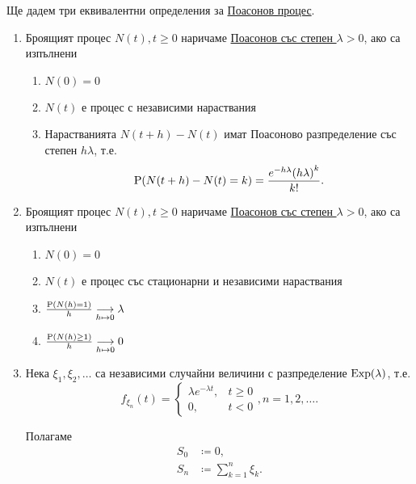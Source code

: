 \documentclass[numbers=endperiod, DIV=15, bibliography=totocnumbered]{scrartcl}
\begin{document}
\begin{definition}
  Ще дадем три еквивалентни определения за \uline{Поасонов процес}.

  \begin{enumerate}
    \item\label{def:pp-1} Броящият процес $N(t), t \geq 0$ наричаме \uline{Поасонов със степен $\lambda > 0$}, ако са изпълнени
    \begin{enumerate}
      \item $N(0) = 0$
      \item $N(t)$ е процес с независими нараствания
      \item Нарастванията $N(t+h)-N(t)$ имат Поасоново разпределение със степен $h\lambda$, т.е.
      \begin{displaymath}
        \operatorname{P}(N(t+h)-N(t) = k)
        =
        \frac{e^{-h\lambda} {(h\lambda)}^k} {k!}.
      \end{displaymath}
    \end{enumerate}

    \item\label{def:pp-2} Броящият процес $N(t), t \geq 0$ наричаме \uline{Поасонов със степен $\lambda > 0$}, ако са изпълнени
    \begin{enumerate}
      \item $N(0) = 0$
      \item $N(t)$ е процес със стационарни и независими нараствания
      \item $\frac {\operatorname{P}(N(h) = 1)} h \underset {h \mapsto 0} \longrightarrow \lambda$
      \item $\frac {\operatorname{P}(N(h) \geq 1)} h \underset {h \mapsto 0} \longrightarrow 0$
    \end{enumerate}

    \item\label{def:pp-3} Нека $\xi_1, \xi_2, \ldots$ са независими случайни величини с разпределение $\operatorname{Exp}(\lambda)$, т.е.
    \begin{displaymath}
      f_{\xi_n}(t) =
      \begin{cases}
        \lambda e^{-\lambda t}, &t \geq 0 \\
        0, &t < 0
      \end{cases},
      n = 1, 2, \ldots.
    \end{displaymath}

    Полагаме
    \begin{align*}
      S_0 &\coloneqq 0, \\
      S_n &\coloneqq \sum_{k=1}^n \xi_k.
    \end{align*}


\end{enumerate}
\end{definition}
\end{document}

